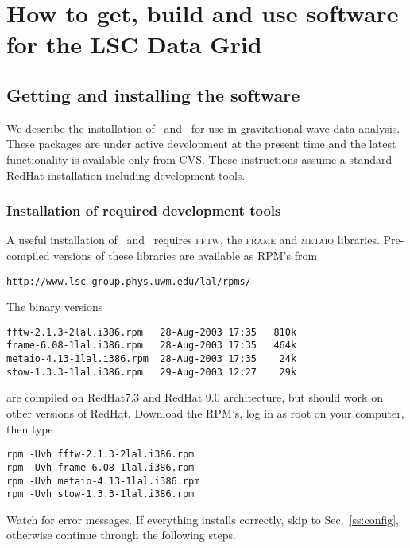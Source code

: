 %
%
\color{black}
\chapter{How to get, build and use software for the LSC Data Grid} 
\section{Getting and installing the software}

We describe the installation of \lal\ and \lalapps\ for use in
gravitational-wave data analysis.   These packages are under active
development at the present time and the latest functionality is
available only from CVS.   These instructions assume a standard
RedHat installation including development tools.   

\subsection{Installation of required development tools}

A useful installation of \lal\ and \lalapps\ requires \textsc{fftw},
the \textsc{frame} and \textsc{metaio} libraries.   Pre-compiled
versions of these libraries are available as RPM's from
\begin{verbatim}
http://www.lsc-group.phys.uwm.edu/lal/rpms/
\end{verbatim}
The binary versions
\begin{verbatim}
fftw-2.1.3-2lal.i386.rpm   28-Aug-2003 17:35   810k  
frame-6.08-1lal.i386.rpm   28-Aug-2003 17:35   464k  
metaio-4.13-1lal.i386.rpm  28-Aug-2003 17:35    24k  
stow-1.3.3-1lal.i386.rpm   29-Aug-2003 12:27    29k 
\end{verbatim}
are compiled on RedHat7.3 and RedHat 9.0 architecture,  but should work on other
versions of RedHat.   Download the RPM's,  log in as root on your
computer,  then type
\begin{verbatim}
rpm -Uvh fftw-2.1.3-2lal.i386.rpm
rpm -Uvh frame-6.08-1lal.i386.rpm
rpm -Uvh metaio-4.13-1lal.i386.rpm
rpm -Uvh stow-1.3.3-1lal.i386.rpm
\end{verbatim}
Watch for error messages.   If everything installs correctly,  skip to
Sec.~\ref{ss:config},  otherwise continue through the following steps.  

